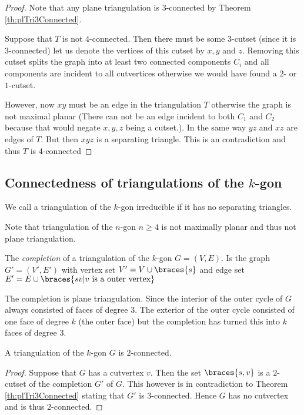   \begin{proof}
    Note that any plane triangulation is $3$-connected by Theorem \ref{th:plTri3Connected}.

    Suppose that $T$ is not $4$-connected. Then there must be some $3$-cutset (since it is $3$-connected) let us denote the vertices of this cutset by $x, y$ and $z$. Removing this cutset splits the graph into at least two connected components $C_i$ and all components are incident to all cutvertices otherwise we would have found a $2$- or $1$-cutset.

    However, now $xy$ must be an edge in the triangulation $T$ otherwise the graph is not maximal planar (There can not be an edge incident to both $C_1$ and $C_2$ because that would negate $x, y ,z$ being a cutset.). In the same way $yz$ and $xz$ are edges of $T$. But then $xyz$ is a separating triangle. This is an contradiction and thus $T$ is $4$-connected
  \end{proof}

\subsection{Connectedness of triangulations of the $k$-gon}
  \begin{defi}
  We call a triangulation of the $k$-gon irreducible if it has no separating triangles.
  \end{defi}


  Note that triangulation of the $n$-gon $n\geq 4$ is not maximally planar and thus not plane triangulation.

  The \emph{completion} of a triangulation of the $k$-gon $G = (V, E)$. Is the graph $G'= (V', E')$ with vertex set $V' = V \cup \braces{s}$ and edge set $E' = E \cup \braces{ sv | v \text{ is a outer vertex}}$

  The completion is plane triangulation.  %
  Since the interior of the outer cycle of $G$ always consisted of faces of degree 3. The exterior of the outer cycle consisted of one face of degree $k$ (the outer face) but the completion has turned this into $k$ faces of degree $3$.

  \begin{thrm}
  A triangulation of the $k$-gon $G$ is $2$-connected.
  \end{thrm}
  \begin{proof}
  Suppose that $G$ has a cutvertex $v$. Then the set $\braces{s, v}$ is a $2$-cutset of the completion $G'$ of $G$. This however is in contradiction to Theorem \ref{th:plTri3Connected} stating that $G'$ is $3$-connected. Hence $G$ has no cutvertex and is thus $2$-connected.
  \end{proof}

